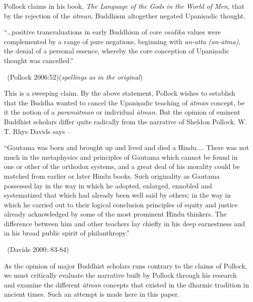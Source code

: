 Pollock claims in his book, \textit{The Language of the Gods in the World of Men,} that by the rejection of the \textit{ātman}, Buddhism altogether negated Upaniṣadic thought.

\begin{myquote}
“…positive transvaluations in early Buddhism of core \textit{vaidika} values were complemented by a range of pure negations, beginning with \textit{an-atta (an-ātma)}, the denial of a personal essence, whereby the core conception of Upaniṣadic thought was cancelled.” 

~\hfill (Pollock 2006:52)(\textit{spellings as in the original})
\end{myquote}

This is a sweeping claim. By the above statement, Pollock wishes to establish that the Buddha wanted to cancel the Upaniṣadic teaching of \textit{ātman} concept, be it the notion of a \textit{paramātman} or individual \textit{ātman}. But the opinion of eminent Buddhist scholars differ quite radically from the narrative of Sheldon Pollock. W. T. Rhys Davids says –

\begin{myquote}
“Gautama was born and brought up and lived and died a Hindu.... There was not much in the metaphysics and principles of Gautama which cannot be found in one or other of the orthodox systems, and a great deal of his morality could be matched from earlier or later Hindu books. Such originality as Gautama possessed lay in the way in which he adopted, enlarged, ennobled and systematized that which had already been well said by others; in the way in which he carried out to their logical conclusion principles of equity and justice already acknowledged by some of the most prominent Hindu thinkers. The difference between him and other teachers lay chiefly in his deep earnestness and in his broad public spirit of philanthropy.” 

~\hfill (Davids 2000: 83-84)
\end{myquote}

As the opinion of major Buddhist scholars runs contrary to the claims of Pollock, we must critically evaluate the narrative built by Pollock through his research and examine the different \textit{ātman} concepts that existed in the dharmic tradition in ancient times. Such an attempt is made here in this paper.

